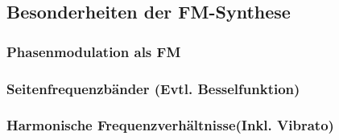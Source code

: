 \subsection{Besonderheiten der FM-Synthese}

\subsubsection{Phasenmodulation als FM}
\subsubsection{Seitenfrequenzbänder (Evtl. Besselfunktion)}
\subsubsection{Harmonische Frequenzverhältnisse(Inkl. Vibrato)}